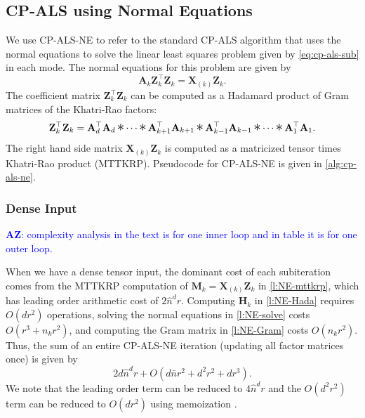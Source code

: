 \documentclass{article}
\newcommand{\mat}[1]{\mathbf{#1}}
\DeclareMathOperator*{\hada}{\scalebox{1.5}{$\ast$}}
\newcommand{\AZ}[1]{\textcolor{blue}{\textbf{AZ}: #1}}
\begin{document}
\subsection{CP-ALS using Normal Equations}
\label{sec:alg:ne}

We use CP-ALS-NE to refer to the standard CP-ALS algorithm that uses the normal equations to solve the linear least squares problem given by \cref{eq:cp-als-sub} in each mode.
The normal equations for this problem are given by
\begin{equation}
  \label{eq:CP-NE}
 \mat{{A}}_k\mat{Z}_k^\top\mat{Z}_k = \mat{X}_{(k)}\mat{Z}_k.
\end{equation}
The coefficient matrix $\mat{Z}_k^\top\mat{Z}_k$ can be computed as a Hadamard product of Gram matrices of the Khatri-Rao factors:
\begin{equation*}
\mat{Z}_k^\top\mat{Z}_k %
= \mat{A}_d^\top \mat{A}_d \hada \cdots \hada \mat{A}_{k+1}^\top\mat{A}_{k+1} \hada \mat{A}_{k-1}^\top\mat{A}_{k-1} \hada \cdots \hada \mat{A}_{1}^\top\mat{A}_{1}.
\end{equation*}
The right hand side matrix $\mat{X}_{(k)}\mat{Z}_k$ is computed as a matricized tensor times Khatri-Rao product (MTTKRP).
Pseudocode for CP-ALS-NE is given in \cref{alg:cp-als-ne}.

\begin{algorithm}[!ht]
  \caption{CP-ALS-NE}
  \label{alg:cp-als-ne}
  
\end{algorithm}

\subsubsection{Dense Input}
\AZ{complexity analysis in the text is for one inner loop and in table it is for one outer loop.}

When we have a dense tensor input, the dominant cost of each subiteration comes from the MTTKRP computation of $\mat{M}_k = \mat{X}_{(k)}\mat{Z}_k$ in \cref{l:NE-mttkrp}, which has leading order arithmetic cost of $2\hat n^dr$.
Computing $\mat{H}_k$ in \cref{l:NE-Hada} requires $O(dr^2)$ operations, solving the normal equations in \cref{l:NE-solve} costs $O(r^3+n_kr^2)$, and computing the Gram matrix in \cref{l:NE-Gram} costs $O(n_kr^2)$.
Thus, the sum of an entire CP-ALS-NE iteration (updating all factor matrices once) is given by
\begin{equation*}
2d\hat n^dr + O(d\bar n r^2 + d^2r^2 + dr^3).
\end{equation*}
We note that the leading order term can be reduced to $4\hat n^d r$ and the $O(d^2r^2)$ term can be reduced to $O(dr^2)$ using memoization \cite{phan2013fast}. 
\end{document}

